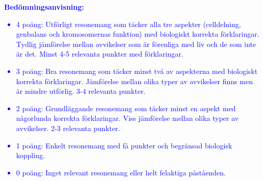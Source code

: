 \documentclass{exam}
\newcommand{\bedomning}[1]{\textcolor{blue}{\textbf{Bedömningsanvisning:} #1}}
\begin{document}
\begin{questions}
\bedomning{
\begin{itemize}
  \item 4 poäng: Utförligt resonemang som täcker alla tre aspekter (celldelning, genbalans och kromosomernas funktion) med biologiskt korrekta förklaringar. Tydlig jämförelse mellan avvikelser som är förenliga med liv och de som inte är det. Minst 4-5 relevanta punkter med förklaringar.
  
  \item 3 poäng: Bra resonemang som täcker minst två av aspekterna med biologiskt korrekta förklaringar. Jämförelse mellan olika typer av avvikelser finns men är mindre utförlig. 3-4 relevanta punkter.
  
  \item 2 poäng: Grundläggande resonemang som täcker minst en aspekt med någorlunda korrekta förklaringar. Viss jämförelse mellan olika typer av avvikelser. 2-3 relevanta punkter.
  
  \item 1 poäng: Enkelt resonemang med få punkter och begränsad biologisk koppling.
  
  \item 0 poäng: Inget relevant resonemang eller helt felaktiga påståenden.
\end{itemize}
}

\end{questions}
\end{document}
